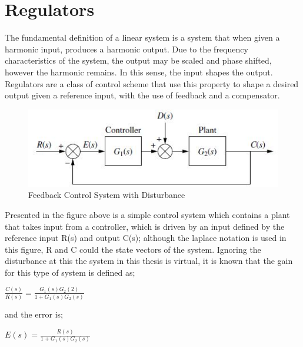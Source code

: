 \documentclass[12pt,openany,a4paper]{book}
\begin{document}
\section{Regulators}
The fundamental definition of a linear system is a system that when given a harmonic input, produces a harmonic output. Due to the frequency characteristics of the system, the output may be scaled and phase shifted, however the harmonic remains. In this sense, the input shapes the output. Regulators are a class of control scheme that use this property to shape a desired output given a reference input, with the use of feedback and a compensator.
\\
\begin{center}
\begin{figure}[htb]
  \includegraphics[width=\linewidth]{feedback_control.jpg}
\caption{Feedback Control System with Disturbance}
\end{figure}
\end{center}
 Presented in the figure above is a simple control system which contains a plant that takes input from a controller, which is driven by an input defined by the reference input R(s) and output C(s); although the laplace notation is used in this figure, R and C could the state vectors of the system. Ignoring the disturbance at this the system in this thesis is virtual, it is known that the gain for this type of system is defined as;

\vspace{\baselineskip}
\begin{center}
$\frac{C(s)}{R(s)} = \frac{G_1(s) G_2(2)}{ 1 + G_1(s) G_2 (s)}$
\end{center}
\vspace{\baselineskip}

and the error is;

\vspace{\baselineskip}
\begin{center}
$E(s) = \frac{R(s)}{1 + G_1(s) G_2(s)}$
\end{center}
\end{document}
